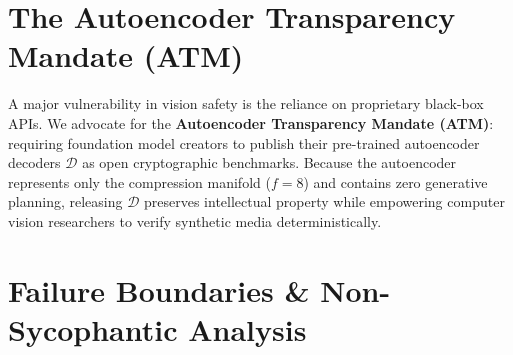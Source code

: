 \documentclass[conference]{IEEEtran}
\begin{document}
\begin{table}[t]
\caption{Adversarial Perturbation Stress-Test Results Across Image Degradations.}
\label{tab:adversarial_stress}
\centering
\small
{}
\end{table}

\section{The Autoencoder Transparency Mandate (ATM)}
\label{sec:atm}

A major vulnerability in vision safety is the reliance on proprietary black-box APIs. We advocate for the \textbf{Autoencoder Transparency Mandate (ATM)}: requiring foundation model creators to publish their pre-trained autoencoder decoders $\mathcal{D}$ as open cryptographic benchmarks. Because the autoencoder represents only the compression manifold ($f=8$) and contains zero generative planning, releasing $\mathcal{D}$ preserves intellectual property while empowering computer vision researchers to verify synthetic media deterministically.

\section{Failure Boundaries \& Non-Sycophantic Analysis}
\label{sec:limitations}
\end{document}
